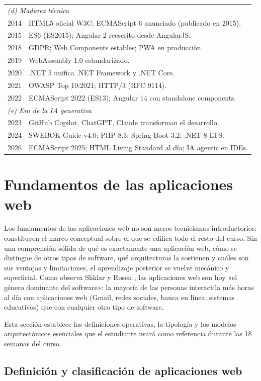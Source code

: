 \documentclass[11pt,a4paper,openany]{book}
\begin{document}
\begin{table}[!htb]
\begin{tabularx}{\textwidth}{lX}
\midrule
\multicolumn{2}{l}{\emph{(d) Madurez técnica}}\\
2014 & HTML5 oficial W3C; ECMAScript 6 anunciado (publicado en 2015).\\
2015 & ES6 (ES2015); Angular 2 reescrito desde AngularJS.\\
2018 & GDPR; Web Components estables; PWA en producción.\\
2019 & WebAssembly 1.0 estandarizado.\\
2020 & .NET 5 unifica .NET Framework y .NET Core.\\
2021 & OWASP Top 10:2021; HTTP/3 (RFC 9114).\\
2022 & ECMAScript 2022 (ES13); Angular 14 con standalone components.\\
\midrule
\multicolumn{2}{l}{\emph{(e) Era de la IA generativa}}\\
2023 & GitHub Copilot, ChatGPT, Claude transforman el desarrollo.\\
2024 & SWEBOK Guide v4.0; PHP 8.3; Spring Boot 3.2; .NET 8 LTS.\\
2026 & ECMAScript 2025; HTML Living Standard al día; IA agentic en IDEs.\\
\bottomrule
\end{tabularx}
\end{table}

\section{Fundamentos de las aplicaciones web}

Los fundamentos de las aplicaciones web no son meros tecnicismos
introductorios: constituyen el marco conceptual sobre el que se
edifica todo el resto del curso. Sin una comprensión sólida de qué
es exactamente una aplicación web, cómo se distingue de otros tipos
de software, qué arquitecturas la sostienen y cuáles son sus ventajas
y limitaciones, el aprendizaje posterior se vuelve mecánico y
superficial. Como observa Shklar y Rosen \cite{shklar2009web}, las
aplicaciones web son hoy «el género dominante del software»: la
mayoría de las personas interactúa más horas al día con aplicaciones
web (Gmail, redes sociales, banca en línea, sistemas educativos) que
con cualquier otro tipo de software.

Esta sección establece las definiciones operativas, la tipología y
los modelos arquitectónicos esenciales que el estudiante usará como
referencia durante las 18 semanas del curso.

\subsection{Definición y clasificación de aplicaciones web}
\end{document}

